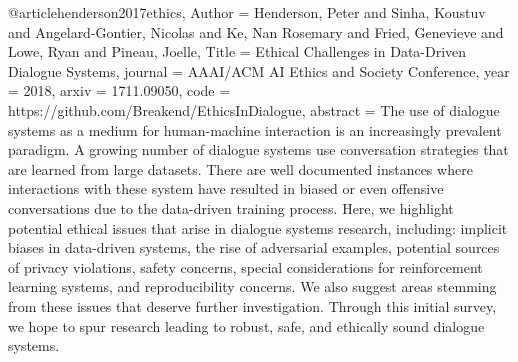 @article{henderson2017ethics,
  Author = {{Henderson}, Peter and {Sinha}, Koustuv and {Angelard-Gontier}, Nicolas and {Ke}, {Nan Rosemary} and {Fried}, {Genevieve} and {Lowe}, Ryan and {Pineau}, Joelle},
  Title = {Ethical Challenges in Data-Driven Dialogue Systems},
  journal = {AAAI/ACM AI Ethics and Society Conference},
  year = {2018},
  arxiv = {1711.09050},
  code = {https://github.com/Breakend/EthicsInDialogue},
  abstract = {The use of dialogue systems as a medium for human-machine interaction is an increasingly prevalent paradigm. A growing number of dialogue systems use conversation strategies that are learned from large datasets. There are well documented instances where interactions with these system have resulted in biased or even offensive conversations due to the data-driven training process. Here, we highlight potential ethical issues that arise in dialogue systems research, including: implicit biases in data-driven systems, the rise of adversarial examples, potential sources of privacy violations, safety concerns, special considerations for reinforcement learning systems, and reproducibility concerns. We also suggest areas stemming from these issues that deserve further investigation. Through this initial survey, we hope to spur research leading to robust, safe, and ethically sound dialogue systems.}
  }
